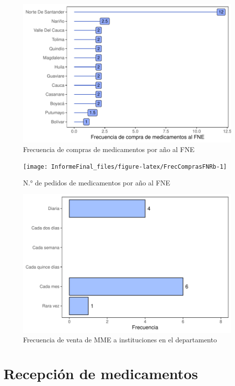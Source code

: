 \documentclass[
]{book}
\begin{document}
\begin{figure}
\includegraphics[width=0.9\linewidth]{InformeFinal_files/figure-latex/FrecComprasFNR-1} \caption{Frecuencia de compras de medicamentos por año al FNE}\label{fig:FrecComprasFNR}
\end{figure}

\begin{figure}
\texttt{[image: InformeFinal\_files/figure-latex/FrecComprasFNRb-1]} \caption{N.° de pedidos de medicamentos por año al FNE}\label{fig:FrecComprasFNRb}
\end{figure}

\begin{figure}
\includegraphics[width=0.85\linewidth]{InformeFinal_files/figure-latex/FrecVentaInstituciones-1} \caption{Frecuencia de venta de MME a instituciones en el departamento}\label{fig:FrecVentaInstituciones}
\end{figure}

\hypertarget{recepciuxf3n-de-medicamentos}{%
\section{Recepción de medicamentos}\label{recepciuxf3n-de-medicamentos}}
\end{document}
